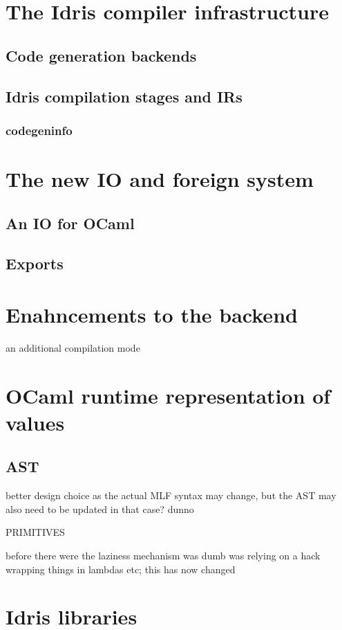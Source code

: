 \section{The Idris compiler infrastructure}
\subsection{Code generation backends}

\subsection{Idris compilation stages and IRs}
\subsubsection{codegeninfo}

\section{The new IO and foreign system}
\subsection{An IO for OCaml}

\subsection{Exports}

\section{Enahncements to the backend} 
an additional compilation mode

\section{OCaml runtime representation of values}

\subsection{AST} 
better design choice as the actual MLF syntax may change,
but the AST may also need to be updated in that case? dunno

PRIMITIVES 



before there were the laziness mechanism was dumb was relying
on a hack wrapping things in lambdas etc; this has now changed
\section{Idris libraries}